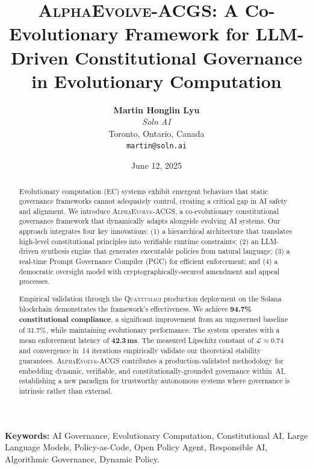 \documentclass[10pt,twocolumn]{article}
\newcommand{\acgs}{\textsc{AlphaEvolve-ACGS}}
\newcommand{\quantumagi}{\textsc{Quantumagi}}
\newcommand{\lipschitz}{\mathcal{L}}
\theoremstyle{definition}
\begin{document}
\title{\textbf{\acgs{}: A Co-Evolutionary Framework for LLM-Driven Constitutional Governance in Evolutionary Computation}}

\author{
    \textbf{Martin Honglin Lyu}\\
    \textit{Soln AI}\\
    Toronto, Ontario, Canada\\
    \texttt{martin@soln.ai}
}

\date{June 12, 2025}

\maketitle

\begin{abstract}
Evolutionary computation (EC) systems exhibit emergent behaviors that static governance frameworks cannot adequately control, creating a critical gap in AI safety and alignment. We introduce \acgs{}, a co-evolutionary constitutional governance framework that dynamically adapts alongside evolving AI systems. Our approach integrates four key innovations: (1) a hierarchical architecture that translates high-level constitutional principles into verifiable runtime constraints; (2) an LLM-driven synthesis engine that generates executable policies from natural language; (3) a real-time Prompt Governance Compiler (PGC) for efficient enforcement; and (4) a democratic oversight model with cryptographically-secured amendment and appeal processes.

Empirical validation through the \quantumagi{} production deployment on the Solana blockchain demonstrates the framework's effectiveness. We achieve \textbf{94.7\% constitutional compliance}, a significant improvement from an ungoverned baseline of 31.7\%, while maintaining evolutionary performance. The system operates with a mean enforcement latency of \textbf{42.3\,ms}. The measured Lipschitz constant of $\lipschitz \approx 0.74$ and convergence in~14 iterations empirically validate our theoretical stability guarantees. \acgs{} contributes a production-validated methodology for embedding dynamic, verifiable, and constitutionally-grounded governance within~AI, establishing a new paradigm for trustworthy autonomous systems where governance is intrinsic rather than external.
\end{abstract}

\textbf{Keywords:} AI Governance, Evolutionary Computation, Constitutional AI, Large Language Models, Policy-as-Code, Open Policy Agent, Responsible AI, Algorithmic Governance, Dynamic Policy.
\end{document}
